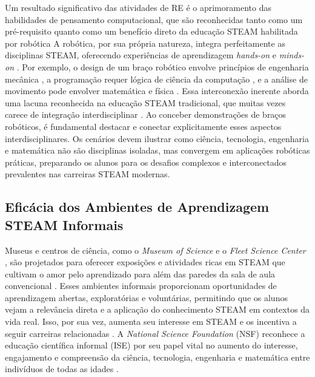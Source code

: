 \documentclass[%
  a4paper,%
  12pt,%
  fleqn,%
  english,%
  brazilian,%
]{article}
\begin{document}
Um resultado significativo das atividades de RE é o aprimoramento das habilidades de pensamento computacional, que são reconhecidas tanto como um pré-requisito quanto como um benefício direto da educação STEAM habilitada por robótica \cite{rahman2024DigitalK12HRI} A robótica, por sua própria natureza, integra perfeitamente as disciplinas STEAM, oferecendo experiências de aprendizagem \emph{hands-on} e \emph{minds-on} \cite{cheung2024SummerLibraries}. Por exemplo, o design de um braço robótico envolve princípios de engenharia mecânica \cite{acebottImportanceRobotics2025}, a programação requer lógica de ciência da computação \cite{whalesbotRevolutionizingSTEM2025}, e a análise de movimento pode envolver matemática e física \cite{acebottImportanceRobotics2025}. Essa interconexão inerente aborda uma lacuna reconhecida na educação STEAM tradicional, que muitas vezes carece de integração interdisciplinar \cite{lim2024IntegratedSTEMRobotics}. Ao conceber demonstrações de braços robóticos, é fundamental destacar e conectar explicitamente esses aspectos interdisciplinares. Os cenários devem ilustrar como ciência, tecnologia, engenharia e matemática não são disciplinas isoladas, mas convergem em aplicações robóticas práticas, preparando os alunos para os desafios complexos e interconectados prevalentes nas carreiras STEAM modernas.

\subsection{Eficácia dos Ambientes de Aprendizagem STEAM Informais}
Museus e centros de ciência, como o \textit{Museum of Science} \cite{mosTeachingSTEM2025} e o \textit{Fleet Science Center} \cite{fleetScienceCenter2025}, são projetados para oferecer exposições e atividades ricas em STEAM que cultivam o amor pelo aprendizado para além das paredes da sala de aula convencional \cite{mosTeachingSTEM2025}. Esses ambientes informais proporcionam oportunidades de aprendizagem abertas, exploratórias e voluntárias, permitindo que os alunos vejam a relevância direta e a aplicação do conhecimento STEAM em contextos da vida real. Isso, por sua vez, aumenta seu interesse em STEAM e os incentiva a seguir carreiras relacionadas \cite{ross2024BeyondExhibits}. A \textit{National Science Foundation} (NSF) reconhece a educação científica informal (ISE) por seu papel vital no aumento do interesse, engajamento e compreensão da ciência, tecnologia, engenharia e matemática entre indivíduos de todas as idades \cite{informalscienceFramework2008}.
\end{document}
